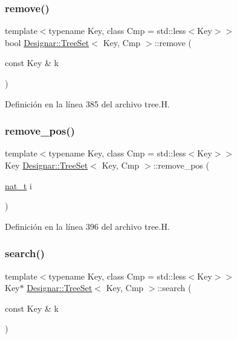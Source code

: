 \subsubsection{\texorpdfstring{remove()}{remove()}}
{\footnotesize\ttfamily template$<$typename Key, class Cmp = std\+::less$<$\+Key$>$$>$ \\
bool \hyperlink{class_designar_1_1_tree_set}{Designar\+::\+Tree\+Set}$<$ Key, Cmp $>$\+::remove (\begin{DoxyParamCaption}\item[{const Key \&}]{k }\end{DoxyParamCaption})\hspace{0.3cm}{\ttfamily [inline]}}



Definición en la línea 385 del archivo tree.\+H.

\mbox{\label{class_designar_1_1_tree_set_ade9d7fc31ba5f1b0313a9182f2f71675}} 
\subsubsection{\texorpdfstring{remove\+\_\+pos()}{remove\_pos()}}
{\footnotesize\ttfamily template$<$typename Key, class Cmp = std\+::less$<$\+Key$>$$>$ \\
Key \hyperlink{class_designar_1_1_tree_set}{Designar\+::\+Tree\+Set}$<$ Key, Cmp $>$\+::remove\+\_\+pos (\begin{DoxyParamCaption}\item[{\hyperlink{namespace_designar_aa72662848b9f4815e7bf31a7cf3e33d1}{nat\+\_\+t}}]{i }\end{DoxyParamCaption})\hspace{0.3cm}{\ttfamily [inline]}}



Definición en la línea 396 del archivo tree.\+H.

\mbox{\label{class_designar_1_1_tree_set_a1f94f8b93dc1e0f9769ce2e7cfb4762f}} 
\subsubsection{\texorpdfstring{search()}{search()}\hspace{0.1cm}{\footnotesize\ttfamily [1/2]}}
{\footnotesize\ttfamily template$<$typename Key, class Cmp = std\+::less$<$\+Key$>$$>$ \\
Key$\ast$ \hyperlink{class_designar_1_1_tree_set}{Designar\+::\+Tree\+Set}$<$ Key, Cmp $>$\+::search (\begin{DoxyParamCaption}\item[{const Key \&}]{k }\end{DoxyParamCaption})\hspace{0.3cm}{\ttfamily [inline]}}



